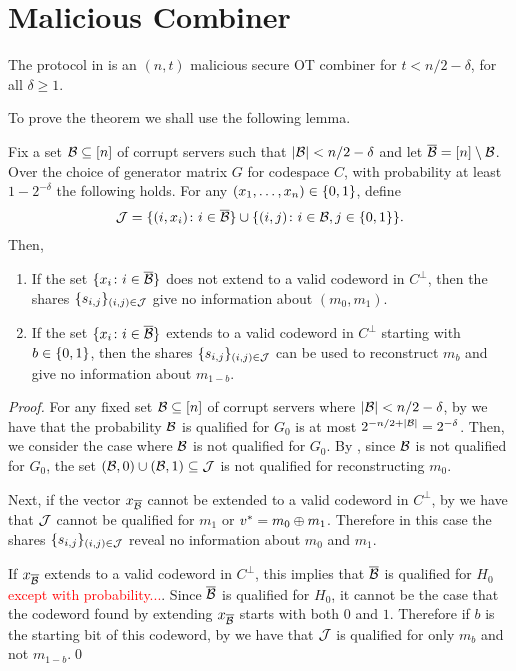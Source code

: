 \section{Malicious Combiner}



\begin{theorem}\label{thm:main}
	The protocol in  is an $(n,t)$ malicious secure OT combiner for $t < n/2 - \delta$, for all $\delta \geq 1$.
\end{theorem}

To prove the theorem we shall use the following lemma.
\begin{lemma}
	Fix a set ${\mathcal B} \subseteq [n]$ of corrupt servers such that $|{\mathcal B}| < n/2 - \delta$ and let $\overline{{\mathcal B}} = [n]\setminus {\mathcal B}$.
	Over the choice of generator matrix $G$ for codespace $C$, with probability at least $1-2^{-\delta}$ the following holds.
	For any $(x_1,\dotsc, x_n) \in {\{0,1\}}$, define
	\begin{align*}
		{\mathcal J} = \{ (i,x_i)\colon i \in \overline{{\mathcal B}} \} \cup \{ (i,j) \colon i \in{\mathcal B}, j \in {\{0,1\}} \}.
	\end{align*}
	Then,
	\begin{enumerate}
		\item If the set $\{x_i \colon i \in \overline{{\mathcal B}} \}$ does not extend to a valid codeword in $C^\perp$, then the shares $\{ s_{i,j} \}_{(i,j) \in {\mathcal J}}$ give no information about $(m_0,m_1)$.
		\item If the set $\{x_i\colon i \in \overline{{\mathcal B}}\}$ extends to a valid codeword in $C^\perp$ starting with $b \in {\{0,1\}}$, then the shares $\{s_{i,j}\}_{(i,j)\in {\mathcal J}}$ can be used to reconstruct $m_b$ and give no information about $m_{1-b}$.
	\end{enumerate}
\end{lemma}
\begin{proof}
	For any fixed set ${\mathcal B}\subseteq [n]$ of corrupt servers where $|{\mathcal B}| < n/2 - \delta$, by  we have that the probability ${\mathcal B}$ is qualified for $G_0$ is at most $2^{-n/2 + |{\mathcal B}|} = 2^{-\delta}$.
	Then, we consider the case where ${\mathcal B}$ is not qualified for $G_0$.
	By , since ${\mathcal B}$ is not qualified for $G_0$, the set $({\mathcal B}, 0) \cup ({\mathcal B},1) \subseteq {\mathcal J}$ is not qualified for reconstructing $m_0$.
	
	Next, if the vector $x_{\overline{{\mathcal B}}}$ cannot be extended to a valid codeword in $C^\perp$, by  we have that ${\mathcal J}$ cannot be qualified for $m_1$ or $v^* = m_0 \oplus m_1$.
	Therefore in this case the shares $\{ s_{i,j} \}_{(i,j) \in {\mathcal J}}$ reveal no information about $m_0$ and $m_1$.
	
	If $x_{\overline{{\mathcal B}}}$ extends to a valid codeword in $C^\perp$, this implies that $\overline{{\mathcal B}}$ is qualified for $H_0$ \textcolor{red}{except with probability...}.
	Since $\overline{{\mathcal B}}$ is qualified for $H_0$, it cannot be the case that the codeword found by extending $x_{\overline{{\mathcal B}}}$ starts with both $0$ and $1$.
	Therefore if $b$ is the starting bit of this codeword, by  we have that ${\mathcal J}$ is qualified for only $m_b$ and not $m_{1-b}$.\qed
\end{proof}

